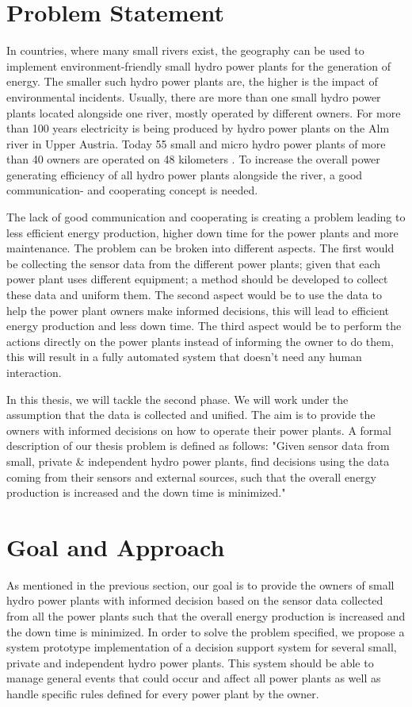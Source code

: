 \section{Problem Statement}
\label{sec:Problem Statement}
In countries, where many small rivers exist, the geography can be used to implement environment-friendly small hydro power plants for the generation of energy. The smaller such hydro power plants are, the higher is the impact of environmental incidents. Usually, there are more than one small hydro power plants located alongside one river, mostly operated by different owners. For more than 100 years electricity is being produced by hydro power plants on the Alm river in Upper Austria. Today 55 small and micro hydro power plants of more than 40 owners are operated on 48 kilometers \cite{SEIT2017}. To increase the overall power generating efficiency of all hydro power plants alongside the river, a good communication- and cooperating concept is needed.

The lack of good communication and cooperating is creating a problem leading to less efficient energy production, higher down time for the power plants and more maintenance. The problem can be broken into different aspects. The first would be collecting the sensor data from the different power plants; given that each power plant uses different equipment; a method should be developed to collect these data and uniform them. The second aspect would be to use the data to help the power plant owners make informed decisions, this will lead to efficient energy production and less down time. The third aspect would be to perform the actions directly on the power plants instead of informing the owner to do them, this will result in a fully automated system that doesn't need any human interaction.

In this thesis, we will tackle the second phase. We will work under the assumption that the data is collected and unified. The aim is to provide the owners with informed decisions on how to operate their power plants. A formal description of our thesis problem is defined as follows: "Given sensor data from small, private \& independent hydro power plants, find decisions using the data coming from their sensors and external sources, such that the overall energy production is increased and the down time is minimized." 
\section{Goal and Approach}
\label{sec:GoalAndApproach}
As mentioned in the previous section, our goal is to provide the owners of small hydro power plants with informed decision based on the sensor data collected from all the power plants such that the overall energy production is increased and the down time is minimized. In order to solve the problem specified, we propose a system prototype implementation of a decision support system for several small, private and independent hydro power plants. This system should be able to manage general events that could occur and affect all power plants as well as handle specific rules defined for every power plant by the owner.

